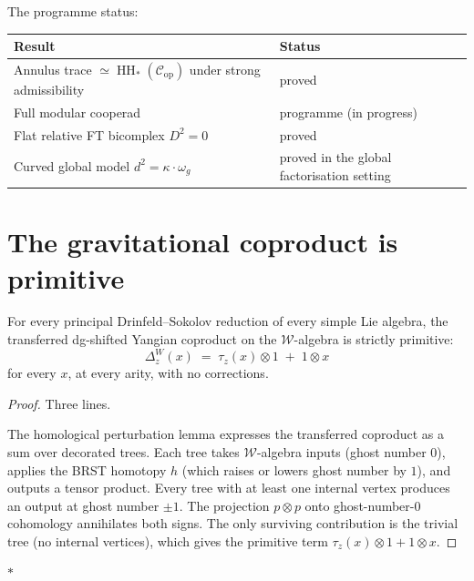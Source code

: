 \documentclass[11pt]{article}
\newcommand{\cC}{\mathcal{C}}
\newcommand{\cW}{\mathcal{W}}
\newcommand{\HH}{\operatorname{HH}}
\newcommand{\sep}{\bigskip\begin{center}$*$\end{center}\medskip}
\begin{document}
The programme status:

\begin{center}
\small
\renewcommand{\arraystretch}{1.15}
\begin{tabular}{@{}ll@{}}
\textbf{Result} & \textbf{Status} \\
\hline
Annulus trace $\simeq \HH_*(\cC_{\mathrm{op}})$ under strong
  admissibility & proved \\[3pt]
Full modular cooperad & programme (in progress) \\[3pt]
Flat relative FT bicomplex $D^2 = 0$ & proved \\[3pt]
Curved global model $d^2 = \kappa \cdot \omega_g$ & proved in the
  global factorisation setting
\end{tabular}
\end{center}


\section{The gravitational coproduct is primitive}
\label{sec:primitive-coproduct}

\begin{theorem}
\label{thm:gravitational-primitivity-wn}
For every principal Drinfeld--Sokolov reduction of every simple
Lie algebra, the transferred dg-shifted Yangian coproduct on the
$\cW$-algebra is strictly primitive:
\[
\Delta_z^W(x)
\;=\;
\tau_z(x) \otimes 1
\;+\; 1 \otimes x
\]
for every $x$, at every arity, with no corrections.
\end{theorem}

\begin{proof}
Three lines.

The homological perturbation lemma expresses the transferred
coproduct as a sum over decorated trees.  Each tree takes
$\cW$-algebra inputs (ghost number $0$), applies the BRST
homotopy $h$ (which raises or lowers ghost number by $1$), and
outputs a tensor product.  Every tree with at least one internal
vertex produces an output at ghost number $\pm 1$.  The projection
$p \otimes p$ onto ghost-number-$0$ cohomology annihilates both
signs.  The only surviving contribution is the trivial tree
(no internal vertices), which gives the primitive term
$\tau_z(x) \otimes 1 + 1 \otimes x$.
\end{proof}

\sep
\end{document}
